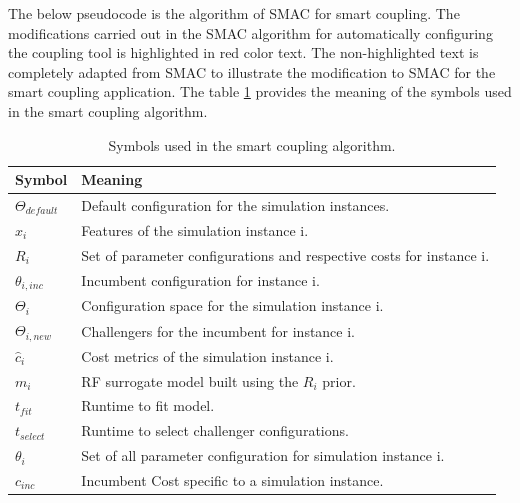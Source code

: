 The below pseudocode is the algorithm of SMAC for smart coupling. The modifications carried out in the SMAC algorithm for automatically configuring the coupling tool is highlighted in red color text. The non-highlighted text is completely adapted from SMAC \cite{SMAC_mainpaper} to illustrate the modification to SMAC for the smart coupling application. The table \ref{table:SMAC_algosymbols} provides the meaning of the symbols used in the smart coupling algorithm.

\begin{table}[]
\centering
\begin{tabular}{|l|l|}
\hline
\textbf{Symbol} & \textbf{Meaning} \\ \hline
$\Theta_{default}$ & Default configuration for the simulation instances. \\ \hline
$x_i$ & Features of the simulation instance i.\\ \hline
$R_i$ & Set of parameter configurations and respective costs for instance i. \\ \hline
$\theta_{i,inc}$ & Incumbent configuration for instance i. \\ \hline
$\Theta_{i}$ & Configuration space for the simulation instance i. \\ \hline
$\Theta_{i,new}$ & Challengers for the incumbent for instance i. \\ \hline
$\hat c_i$ & Cost metrics of the simulation instance i. \\ \hline
$m_i$ & RF surrogate model built using the $R_i$ prior. \\ \hline
$t_{fit}$ & Runtime to fit model. \\ \hline
$t_{select}$ & Runtime to select challenger configurations. \\ \hline
$\theta_{i}$ & Set of all parameter configuration for simulation instance i. \\\hline
$c_{inc}$ & Incumbent Cost specific to a simulation instance. \\ \hline
\end{tabular}
\captionsetup{justification=justified}
\caption{Symbols used in the smart coupling algorithm.}
\label{table:SMAC_algosymbols}
\end{table}

